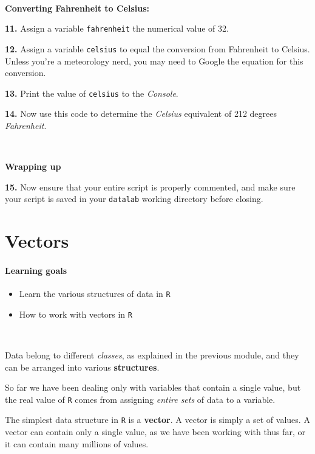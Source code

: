 \documentclass[]{book}
\providecommand{\tightlist}{%
  \setlength{\itemsep}{0pt}\setlength{\parskip}{0pt}}
\begin{document}
~

\textbf{Converting Fahrenheit to Celsius:}

\textbf{11.} Assign a variable \texttt{fahrenheit} the numerical value of 32.

\textbf{12.} Assign a variable \texttt{celsius} to equal the conversion from Fahrenheit to Celsius. Unless you're a meteorology nerd, you may need to Google the equation for this conversion.

\textbf{13.} Print the value of \texttt{celsius} to the \emph{Console}.

\textbf{14.} Now use this code to determine the \emph{Celsius} equivalent of 212 degrees \emph{Fahrenheit}.

~

\textbf{Wrapping up}

\textbf{15.} Now ensure that your entire script is properly commented, and make sure your script is saved in your \texttt{datalab} working directory before closing.

\hypertarget{vectors}{%
\chapter{Vectors}\label{vectors}}

\hypertarget{learning-goals-3}{%
\subsubsection*{Learning goals}\label{learning-goals-3}}

\begin{itemize}
\tightlist
\item
  Learn the various structures of data in \texttt{R}\\
\item
  How to work with vectors in \texttt{R}
\end{itemize}

~

Data belong to different \emph{classes}, as explained in the previous module, and they can be arranged into various \textbf{structures}.

So far we have been dealing only with variables that contain a single value, but the real value of \texttt{R} comes from assigning \emph{entire sets} of data to a variable.

The simplest data structure in \texttt{R} is a \textbf{vector}. A vector is simply a set of values. A vector can contain only a single value, as we have been working with thus far, or it can contain many millions of values.
\end{document}
